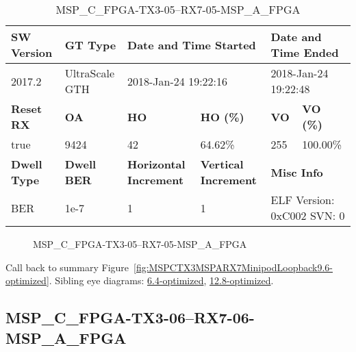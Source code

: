 \begin{table}[h]
\centering
\caption{MSP\_C\_FPGA-TX3-05--RX7-05-MSP\_A\_FPGA}
\label{tab:MSPCFPGATX305RX705MSPAFPGA9.6-optimized}
\begin{tabular}{@{}|l|l|l|l|l|l|@{}}
\toprule
\textbf{SW Version}                & \textbf{GT Type}   & \multicolumn{2}{l|}{\textbf{Date and Time Started}}            & \multicolumn{2}{l|}{\textbf{Date and Time Ended}}        \\ \midrule
2017.2                       & UltraScale GTH          & \multicolumn{2}{l|}{2018-Jan-24 19:22:16}                   & \multicolumn{2}{l|}{2018-Jan-24 19:22:48}               \\ \midrule
\textbf{Reset RX}                  & \textbf{OA} & \textbf{HO}   & \textbf{HO (\%)} & \textbf{VO} & \textbf{VO (\%)} \\ \midrule
true & 9424        & 42          & 64.62\%        & 255        & 100.00\%       \\ \midrule
\textbf{Dwell Type}                & \textbf{Dwell BER} & \textbf{Horizontal Increment} & \textbf{Vertical Increment}    & \multicolumn{2}{l|}{\textbf{Misc Info}}                  \\ \midrule
BER                            & 1e-7        & 1        & 1           & \multicolumn{2}{l|}{ELF Version: 0xC002 SVN: 0}                         \\ \bottomrule
\end{tabular}
\end{table}

\begin{figure}[h]
\caption{MSP\_C\_FPGA-TX3-05--RX7-05-MSP\_A\_FPGA} \label{fig:MSPCFPGATX305RX705MSPAFPGA9.6-optimized}
\end{figure}

Call back to summary Figure~\ref{fig:MSPCTX3MSPARX7MinipodLoopback9.6-optimized}.
Sibling eye diagrams: \hyperref[sec:MSPCFPGATX305RX705MSPAFPGA6.4-optimized]{6.4-optimized}, \hyperref[sec:MSPCFPGATX305RX705MSPAFPGA12.8-optimized]{12.8-optimized}.

\clearpage
\newpage


\subsection{MSP\_C\_FPGA-TX3-06--RX7-06-MSP\_A\_FPGA}\label{sec:MSPCFPGATX306RX706MSPAFPGA9.6-optimized}

